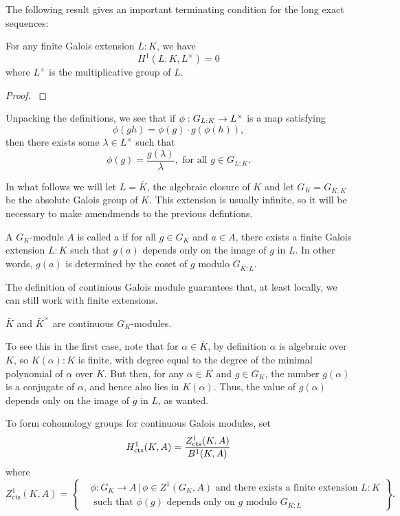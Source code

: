 \documentclass[12pt, a4paper]{report}
\begin{document}
The following result gives an important terminating condition for the
long exact sequences:

\begin{thm}
  For any finite Galois extension $L:K$, we have
  \[ H^1(L : K, L^{\times}) = 0\]
  where $L^\times$ is the multiplicative group of $L$.
\end{thm}
\begin{proof}
  \cite[See][Chapter X, page 150]{cohomology}
\end{proof}

Unpacking the definitions, we see that if $\phi : G_{L:K} \rightarrow L^\times$ is a map
satisfying
\[\phi(gh)=\phi(g) \cdot g (\phi(h)),\]
then there exists some $\lambda \in L^\times$ such that
$$\phi(g) = \frac{g(\lambda)}{\lambda}, \text{ for all } g \in G_{L:K}. $$

In what follows we will let $L = \bar{K}$, the algebraic closure of $K$ and let
$G_K = G_{\bar{K}:K}$ be the absolute Galois group of $K$.
This extension is usually infinite, so
it will be necessary to make amendmends to the previous defintions. 

\begin{defn}
  A $G_K$-module $A$ is called a 
  if for all $g \in G_K$ and $ a \in A$,
  there exists a finite Galois extension $L:K$ such that $g(a)$
  depends only on the image of $g$ in $L$. In other words, $g(a)$ is determined
  by the coset of $g$ modulo $G_{\bar{K}:L}$.
\end{defn}

The definition of continious Galois module guarantees that, at least locally, we
can still work with finite extensions.

\begin{example}
  $\bar{K}$ and $ \bar{K}^{\times}$ are continuous $G_K$-modules.

  To see this in the first case,
  note that for $\alpha \in \bar{K}$, by definition $\alpha$ is algebraic over
  $K$, so $K(\alpha) : K$ is finite, with degree equal to the degree of the
  minimal polynomial of $\alpha$ over $K$.
  But then, for any $\alpha \in K$ and $g \in G_K$, the number $g(\alpha)$ is a conjugate
  of $\alpha$, and hence also lies in $K(\alpha).$ Thus, the value of
  $g(\alpha)$ depends only on the image of $g$ in $L$, as wanted.
\end{example}

To form cohomology groups for continuous Galois modules, set
\[H^1_{\textnormal{cts}}(K,A) = \frac{Z^1_{\text{cts}}(K,A)}{B^1(K,A)}\]
where
\begin{equation*}
  Z^1_{\text{cts}}(K,A) = \left\{
    \begin{aligned}
      &\phi : G_K \rightarrow A \, | \, \phi \in Z^1(G_K,A) \text{ and }
     \text{there exists a finite extension } L : K \\ 
     &\text{ such that } \phi(g)
      \text{ depends only on } g \text{ modulo } G_{\bar{K}:L}
    \end{aligned}
\right\}.
\end{equation*}
\end{document}
